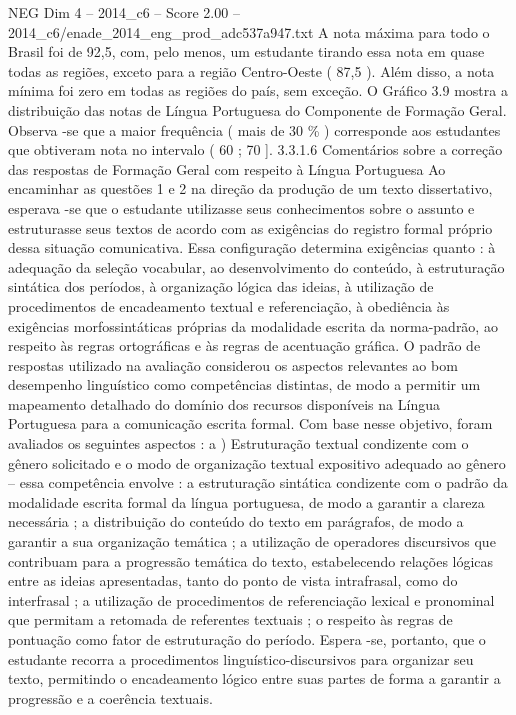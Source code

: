 \begin{textsample}{NEG Dim 4 – 2014\_c6 – Score 2.00 – 2014\_c6/enade\_2014\_eng\_prod\_adc537a947.txt}
A nota máxima para todo o Brasil foi de 92,5, com, pelo menos, um estudante tirando essa nota em quase todas as regiões, exceto para a região Centro-Oeste ( 87,5 ).
Além disso, a nota mínima foi zero em todas as regiões do país, sem exceção.
O Gráfico 3.9 mostra a distribuição das notas de Língua Portuguesa do Componente de Formação Geral.
Observa -se que a maior frequência ( mais de 30 \% ) corresponde aos estudantes que obtiveram nota no intervalo ( 60 ; 70 ]. 3.3.1.6 Comentários sobre a correção das respostas de Formação Geral com respeito à Língua Portuguesa Ao encaminhar as questões 1 e 2 na direção da produção de um texto dissertativo, esperava -se que o estudante utilizasse seus conhecimentos sobre o assunto e estruturasse seus textos de acordo com as exigências do registro formal próprio dessa situação comunicativa.
Essa configuração determina exigências quanto : à adequação da seleção vocabular, ao desenvolvimento do conteúdo, à estruturação sintática dos períodos, à organização lógica das ideias, à utilização de procedimentos de encadeamento textual e referenciação, à obediência às exigências morfossintáticas próprias da modalidade escrita da norma-padrão, ao respeito às regras ortográficas e às regras de acentuação gráfica.
O padrão de respostas utilizado na avaliação considerou os aspectos relevantes ao bom desempenho linguístico como competências distintas, de modo a permitir um mapeamento detalhado do domínio dos recursos disponíveis na Língua Portuguesa para a comunicação escrita formal.
Com base nesse objetivo, foram avaliados os seguintes aspectos : a ) Estruturação textual condizente com o gênero solicitado e o modo de organização textual expositivo adequado ao gênero – essa competência envolve : a estruturação sintática condizente com o padrão da modalidade escrita formal da língua portuguesa, de modo a garantir a clareza necessária ; a distribuição do conteúdo do texto em parágrafos, de modo a garantir a sua organização temática ; a utilização de operadores discursivos que contribuam para a progressão temática do texto, estabelecendo relações lógicas entre as ideias apresentadas, tanto do ponto de vista intrafrasal, como do interfrasal ; a utilização de procedimentos de referenciação lexical e pronominal que permitam a retomada de referentes textuais ; o respeito às regras de pontuação como fator de estruturação do período.
Espera -se, portanto, que o estudante recorra a procedimentos linguístico-discursivos para organizar seu texto, permitindo o encadeamento lógico entre suas partes de forma a garantir a progressão e a coerência textuais.

\end{textsample}
